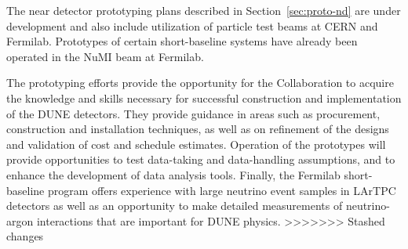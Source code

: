 The near detector prototyping plans described in Section~\ref{sec:proto-nd} are under development and also %
include utilization of particle test beams at CERN and Fermilab.  Prototypes of certain short-baseline  systems have already been operated in the NuMI beam at Fermilab.

The prototyping efforts provide the opportunity for the Collaboration to acquire the knowledge and skills necessary for successful construction and implementation of the DUNE detectors. They provide guidance  %
 in areas such as procurement, construction and installation techniques, as well as on refinement of the designs and validation of cost and schedule estimates.  Operation of the %
prototypes will provide  opportunities to test data-taking and data-handling assumptions, and to enhance the development of data analysis tools.  %
Finally, the Fermilab short-baseline program offers experience with large neutrino event samples in LArTPC detectors as well as an opportunity to make detailed measurements of neutrino-argon interactions that are important for DUNE physics.
>>>>>>> Stashed changes

